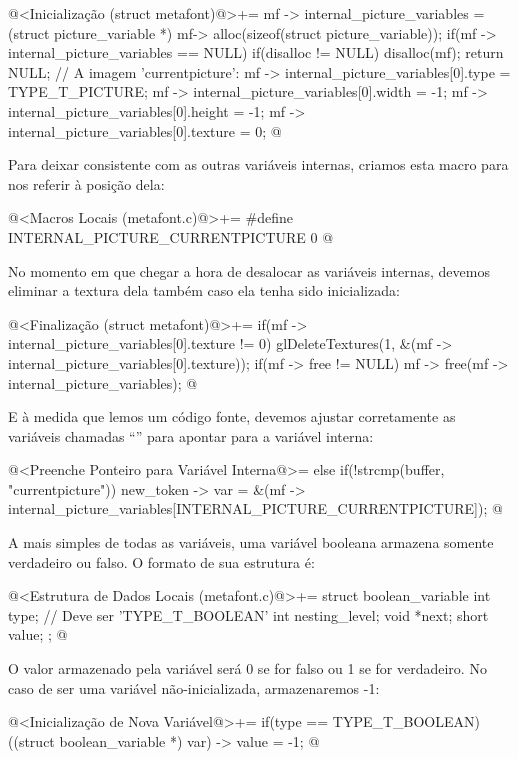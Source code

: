 \iniciocodigo
@<Inicialização (struct metafont)@>+=
mf -> internal_picture_variables = (struct picture_variable *)
                                   mf-> alloc(sizeof(struct picture_variable));
if(mf -> internal_picture_variables == NULL){
  if(disalloc != NULL)
    disalloc(mf);
  return NULL;
}
// A imagem 'currentpicture':
mf -> internal_picture_variables[0].type = TYPE_T_PICTURE;
mf -> internal_picture_variables[0].width = -1;
mf -> internal_picture_variables[0].height = -1;
mf -> internal_picture_variables[0].texture = 0;
@
\fimcodigo

Para deixar consistente com as outras variáveis internas, criamos esta
macro para nos referir à posição dela:

\iniciocodigo
@<Macros Locais (metafont.c)@>+=
#define INTERNAL_PICTURE_CURRENTPICTURE 0
@
\fimcodigo

No momento em que chegar a hora de desalocar as variáveis internas,
devemos eliminar a textura dela também caso ela tenha sido
inicializada:

\iniciocodigo
@<Finalização (struct metafont)@>+=
if(mf -> internal_picture_variables[0].texture != 0)
  glDeleteTextures(1, &(mf -> internal_picture_variables[0].texture));
if(mf -> free != NULL)
  mf -> free(mf -> internal_picture_variables);
@
\fimcodigo

E à medida que lemos um código fonte, devemos ajustar corretamente as
variáveis chamadas ``'' para apontar para a
variável interna:

\iniciocodigo
@<Preenche Ponteiro para Variável Interna@>=
else if(!strcmp(buffer, "currentpicture"))
  new_token -> var =
          &(mf -> internal_picture_variables[INTERNAL_PICTURE_CURRENTPICTURE]);
@
\fimcodigo


A mais simples de todas as variáveis, uma variável booleana armazena
somente verdadeiro ou falso. O formato de sua estrutura é:

\iniciocodigo
@<Estrutura de Dados Locais (metafont.c)@>+=
struct boolean_variable{
  int type; // Deve ser 'TYPE_T_BOOLEAN'
  int nesting_level;
  void *next;
  short value;
};
@
\fimcodigo

O valor  armazenado pela variável será 0 se for
falso ou 1 se for verdadeiro. No caso de ser uma variável
não-inicializada, armazenaremos -1:

\iniciocodigo
@<Inicialização de Nova Variável@>+=
if(type == TYPE_T_BOOLEAN)
  ((struct boolean_variable *) var) -> value = -1;
@
\fimcodigo


